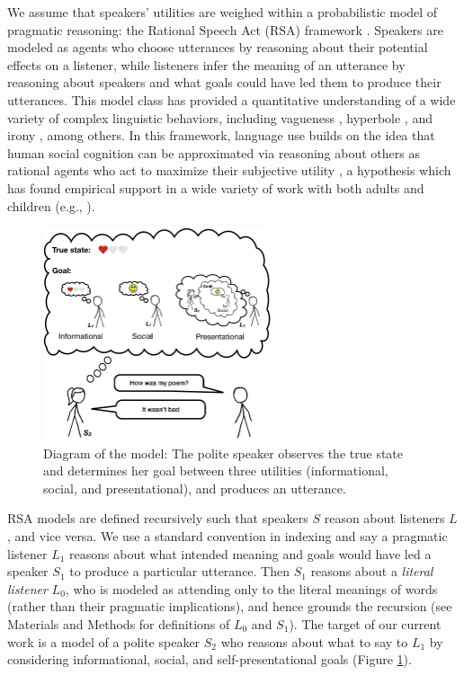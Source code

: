 \documentclass[9pt,twocolumn,twoside,lineno]{main_class_file}
\begin{document}
We assume that speakers' utilities are weighed within a probabilistic model of pragmatic reasoning: the Rational Speech Act (RSA) framework \cite{frank2012, goodman2016}. Speakers are modeled as
agents who choose utterances by reasoning about their potential effects on a
listener, while listeners infer the meaning of an utterance by reasoning about speakers and what goals could have led them to produce their utterances.
This model class has provided a quantitative understanding of a wide variety of complex linguistic behaviors, including vagueness \cite{lassiter2017adjectival}, hyperbole \cite{kao2014}, and irony
\cite{kao2015}, among others.
In this framework, language use builds on the idea that human social cognition can
be approximated via reasoning about others as rational agents who act to
maximize their subjective utility \cite{baker2009action}, a
hypothesis which has found empirical support in a wide variety of work with both
adults and children (e.g., \cite{jara2016naive, liu2017ten}).

\begin{figure}[!h]
\includegraphics[width=0.6\textwidth]{fig/model} \centering \caption{Diagram of the model: The polite speaker observes the true state and determines her goal between three utilities (informational, social, and presentational), and produces an utterance.}\label{fig:model}
\end{figure}

RSA models are defined recursively such that speakers \(S\)  reason about
listeners  \(L\), and vice versa. We use a standard convention in indexing and say a pragmatic listener \(L_1\) reasons about what intended meaning
and goals would have led a speaker \(S_1\) to produce a particular
utterance. Then \(S_1\) reasons about a \emph{literal listener}
\(L_0\), who is modeled as attending only to the literal meanings of words
(rather than their pragmatic implications), and hence grounds the
recursion (see Materials and Methods for definitions of $L_0$ and $S_1$).
The target of our current work is a model of a polite speaker \(S_2\)
who reasons about what to say to \(L_1\) by
considering informational, social, and self-presentational goals (Figure
\ref{fig:model}).
\end{document}
